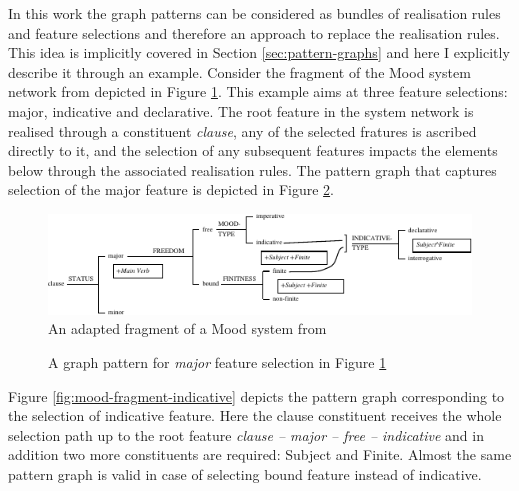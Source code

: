
    In this work the graph patterns can be considered as bundles of realisation rules and feature selections and therefore an approach to replace the realisation rules. This idea is implicitly covered in Section \ref{sec:pattern-graphs} and here I explicitly describe it through an example. Consider the fragment of the Mood system network from \citet[162]{Halliday2013} depicted in Figure \ref{fig:mood-fragment}. This example aims at three feature selections: major, indicative and declarative. The root feature in the system network is realised through a constituent \textit{clause}, any of the selected fratures is ascribed directly to it, and the selection of any subsequent features impacts the elements below through the associated realisation rules. The pattern graph that captures selection of the major feature is depicted in Figure \ref{fig:mood-fragment-major}. 

    \begin{figure}[!ht]
        \centering
        \includegraphics[width=\textwidth]{Figures/Example/mood-fragment.pdf}
        \caption{An adapted fragment of a Mood system from \citep[162]{Halliday2013} }
        \label{fig:mood-fragment}
    \end{figure}

    \begin{figure}[!ht]
        \centering
        \caption{A graph pattern for \textit{major} feature selection in Figure \ref{fig:mood-fragment}}
        \label{fig:mood-fragment-major}
    \end{figure}

    Figure \ref{fig:mood-fragment-indicative} depicts the pattern graph corresponding to the selection of indicative feature. Here the clause constituent receives the whole selection path up to the root feature \textit{clause -- major -- free -- indicative} and in addition two more constituents are required: Subject and Finite. Almost the same pattern graph is valid in case of selecting bound feature instead of indicative.

